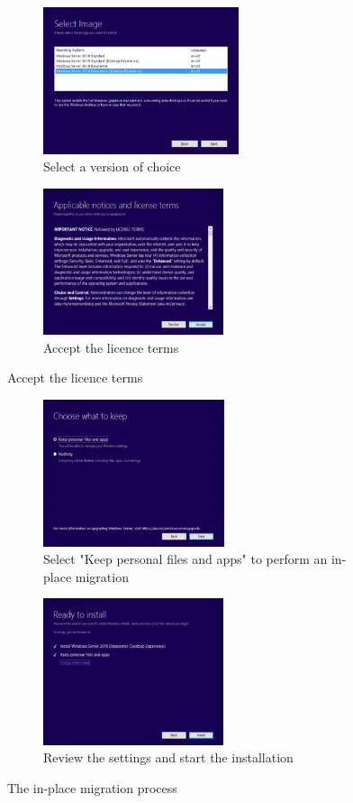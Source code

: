 \begin{figure}[h]\ContinuedFloat
	\begin{subfigure}{0.5\textwidth}
		\captionsetup{width=0.8\linewidth}
		\includegraphics[width=0.9\linewidth,height=4.3cm]{img/Methodologie/InPlace2.png} 
		\centering
		\caption{Select a version of choice}
	\end{subfigure}
	\begin{subfigure}{0.5\textwidth}
		\captionsetup{width=0.8\linewidth}
		\includegraphics[width=0.9\linewidth,height=4.3cm]{img/Methodologie/InPlace3.png}
		\centering
		\caption{Accept the licence terms}
	\end{subfigure}
\end{figure}
\begin{figure}[h]\ContinuedFloat
	\begin{subfigure}{0.5\textwidth}
		\captionsetup{width=0.8\linewidth}
		\includegraphics[width=0.9\linewidth,height=4.3cm]{img/Methodologie/InPlace4.png} 
		\centering
		\caption{Select "Keep personal files and apps" to perform an in-place migration}
	\end{subfigure}
	\begin{subfigure}{0.5\textwidth}
		\captionsetup{width=0.8\linewidth}
		\includegraphics[width=0.9\linewidth,height=4.3cm]{img/Methodologie/InPlace5.png}
		\centering
		\caption{Review the settings and start the installation}
	\end{subfigure}
	\caption[In-place migration]{The in-place migration process}
	\label{fig:Inplace}
\end{figure}
